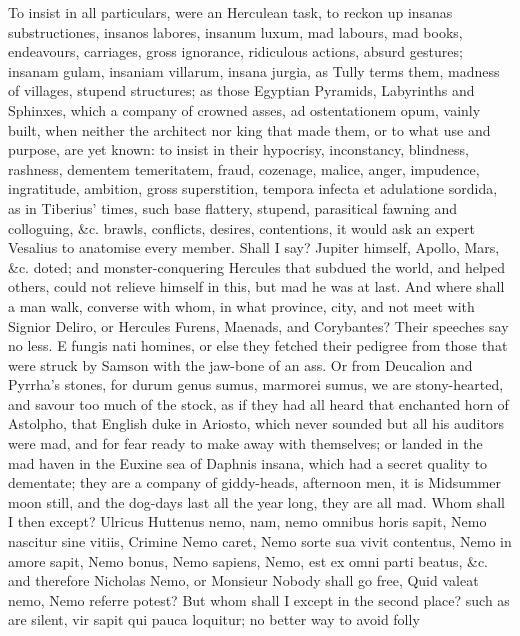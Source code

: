 {To insist in all particulars, were an Herculean task, to
reckon up insanas substructiones, insanos labores, insanum
luxum, mad labours, mad books, endeavours, carriages, gross ignorance,
ridiculous actions, absurd gestures; insanam gulam, insaniam villarum,
insana jurgia, as Tully terms them, madness of villages, stupend
structures; as those Egyptian Pyramids, Labyrinths and Sphinxes, which
a company of crowned asses, ad ostentationem opum, vainly built, when
neither the architect nor king that made them, or to what use and
purpose, are yet known: to insist in their hypocrisy, inconstancy,
blindness, rashness, dementem temeritatem, fraud, cozenage, malice,
anger, impudence, ingratitude, ambition, gross superstition,
tempora infecta et adulatione sordida, as in Tiberius' times, such
base flattery, stupend, parasitical fawning and colloguing, \&c. brawls,
conflicts, desires, contentions, it would ask an expert Vesalius to
anatomise every member. Shall I say? Jupiter himself, Apollo, Mars, \&c.
doted; and monster-conquering Hercules that subdued the world, and
helped others, could not relieve himself in this, but mad he was at
last. And where shall a man walk, converse with whom, in what province,
city, and not meet with Signior Deliro, or Hercules Furens, Maenads,
and Corybantes? Their speeches say no less. E fungis nati homines,
or else they fetched their pedigree from those that were struck by
Samson with the jaw-bone of an ass. Or from Deucalion and Pyrrha's
stones, for durum genus sumus,  marmorei sumus, we are
stony-hearted, and savour too much of the stock, as if they had all
heard that enchanted horn of Astolpho, that English duke in Ariosto,
which never sounded but all his auditors were mad, and for fear ready
to make away with themselves; or landed in the mad haven in the
Euxine sea of Daphnis insana, which had a secret quality to dementate;
they are a company of giddy-heads, afternoon men, it is Midsummer moon
still, and the dog-days last all the year long, they are all mad. Whom
shall I then except? Ulricus Huttenus nemo, nam, nemo omnibus
horis sapit, Nemo nascitur sine vitiis, Crimine Nemo caret, Nemo sorte
sua vivit contentus, Nemo in amore sapit, Nemo bonus, Nemo sapiens,
Nemo, est ex omni parti beatus, \&c. and therefore Nicholas Nemo,
or Monsieur Nobody shall go free, Quid valeat nemo, Nemo referre
potest? But whom shall I except in the second place? such as are
silent, vir sapit qui pauca loquitur; no better way to avoid folly
}
